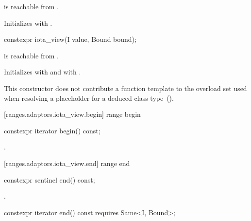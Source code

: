 \begin{itemdescr}
\begin{addedblock}
\pnum
\requires {} is reachable from .
\end{addedblock}

\pnum
\effects Initializes  with .
\end{itemdescr}

%
\begin{itemdecl}
constexpr iota_view(I value, Bound bound);
\end{itemdecl}

\begin{itemdescr}
\pnum
\requires {} is reachable from .

\pnum
\effects Initializes  with  and  with
.

\pnum
\remarks This constructor does not contribute a function template to the overload
set used when resolving a placeholder for a deduced class
type~().
\end{itemdescr}

[ranges.adaptors.iota_view.begin]{ range begin}

%
\begin{itemdecl}
constexpr iterator begin() const;
\end{itemdecl}

\begin{itemdescr}
\pnum
\returns {}.
\end{itemdescr}

[ranges.adaptors.iota_view.end]{ range end}

%
\begin{itemdecl}
constexpr sentinel end() const;
\end{itemdecl}

\begin{itemdescr}
\pnum
\returns {}.
\end{itemdescr}

%
\begin{itemdecl}
constexpr iterator end() const requires Same<I, Bound>;
\end{itemdecl}

